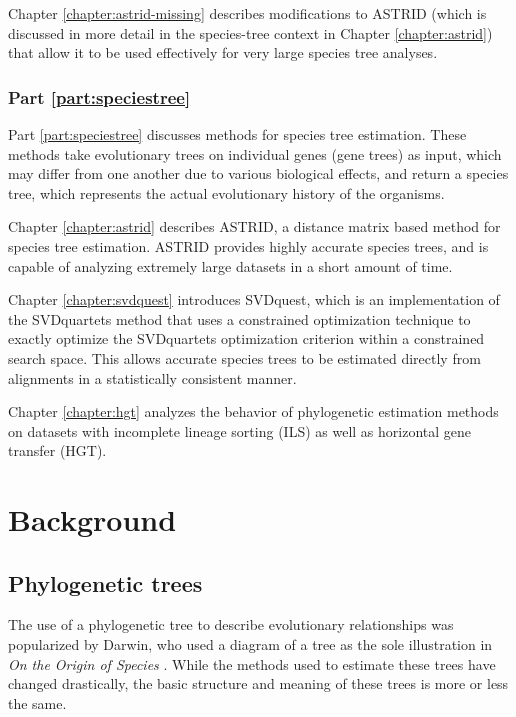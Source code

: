 \documentclass[edeposit,fullpage]{uiucthesis2014}
\theoremstyle{definition}
\begin{document}
Chapter \ref{chapter:astrid-missing} describes modifications to ASTRID
(which is discussed in more detail in the species-tree context in
Chapter \ref{chapter:astrid}) that allow it to be used effectively for
very large species tree analyses.

\subsection*{Part \ref{part:speciestree}}

Part \ref{part:speciestree} discusses methods for species tree
estimation. These methods take evolutionary trees on individual genes
(gene trees) as input, which may differ from one another due to
various biological effects, and return a species tree, which
represents the actual evolutionary history of the organisms.

Chapter \ref{chapter:astrid} describes ASTRID, a distance matrix based
method for species tree estimation. ASTRID provides highly accurate
species trees, and is capable of analyzing extremely large datasets in
a short amount of time.

Chapter \ref{chapter:svdquest} introduces SVDquest, which is an
implementation of the SVDquartets method that uses a constrained
optimization technique to exactly optimize the SVDquartets
optimization criterion within a constrained search space. This allows
accurate species trees to be estimated directly from alignments in a
statistically consistent manner.

Chapter \ref{chapter:hgt} analyzes the behavior of phylogenetic
estimation methods on datasets with incomplete lineage sorting (ILS)
as well as horizontal gene transfer (HGT). 


\chapter{Background}
\label{chapter:background}
\section{Phylogenetic trees}

The use of a phylogenetic tree to describe evolutionary relationships
was popularized by Darwin, who used a diagram of a tree as the sole
illustration in \emph{On the Origin of Species}
\cite{darwin1859origin}. While the methods used to estimate these
trees have changed drastically, the basic structure and meaning of
these trees is more or less the same.
\end{document}
